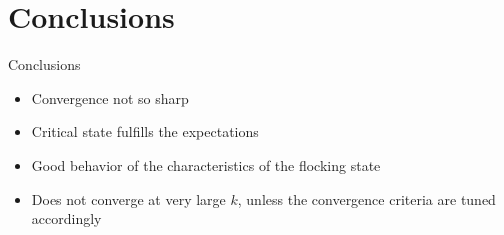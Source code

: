 \documentclass{beamer}
\begin{document}
\section{Conclusions}
\begin{frame}{Conclusions}
	\begin{itemize}
		\item Convergence not so sharp
		\vspace{0.5cm}
		\item Critical state fulfills the expectations
		\vspace{0.5cm}
		\item Good behavior of the characteristics of the flocking state
		\vspace{0.5cm}
		\item Does not converge at very large $k$, unless the convergence criteria are tuned accordingly
	\end{itemize}
\end{frame}
\end{document}
